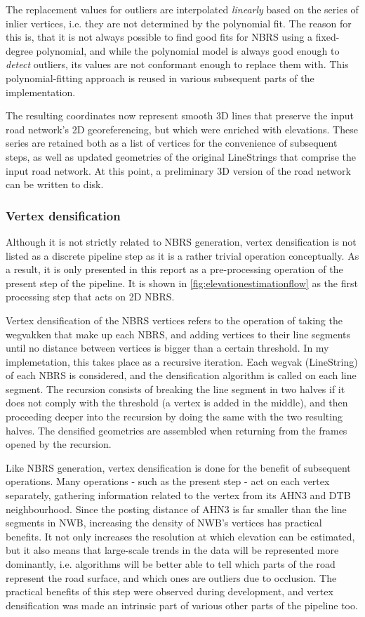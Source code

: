 The replacement values for outliers are interpolated \textit{linearly} based on the series of inlier vertices, i.e. they are not determined by the polynomial fit. The reason for this is, that it is not always possible to find good fits for NBRS using a fixed-degree polynomial, and while the polynomial model is always good enough to \textit{detect} outliers, its values are not conformant enough to replace them with. This polynomial-fitting approach is reused in various subsequent parts of the implementation.

The resulting coordinates now represent smooth 3D lines that preserve the input road network's 2D georeferencing, but which were enriched with elevations. These series are retained both as a list of vertices for the convenience of subsequent steps, as well as updated geometries of the original LineStrings that comprise the input road network. At this point, a preliminary 3D version of the road network can be written to disk.

\subsubsection{Vertex densification}

Although it is not strictly related to NBRS generation, vertex densification is not listed as a discrete pipeline step as it is a rather trivial operation conceptually. As a result, it is only presented in this report as a pre-processing operation of the present step of the pipeline. It is shown in \ref{fig:elevationestimationflow} as the first processing step that acts on 2D NBRS.

Vertex densification of the NBRS vertices refers to the operation of taking the wegvakken that make up each NBRS, and adding vertices to their line segments until no distance between vertices is bigger than a certain threshold. In my implemetation, this takes place as a recursive iteration. Each wegvak (LineString) of each NBRS is considered, and the densification algorithm is called on each line segment. The recursion consists of breaking the line segment in two halves if it does not comply with the threshold (a vertex is added in the middle), and then proceeding deeper into the recursion by doing the same with the two resulting halves. The densified geometries are assembled when returning from the frames opened by the recursion.

Like NBRS generation, vertex densification is done for the benefit of subsequent operations. Many operations - such as the present step - act on each vertex separately, gathering information related to the vertex from its AHN3 and DTB neighbourhood. Since the posting distance of AHN3 is far smaller than the line segments in NWB, increasing the density of NWB's vertices has practical benefits. It not only increases the resolution at which elevation can be estimated, but it also means that large-scale trends in the data will be represented more dominantly, i.e. algorithms will be better able to tell which parts of the road represent the road surface, and which ones are outliers due to occlusion. The practical benefits of this step were observed during development, and vertex densification was made an intrinsic part of various other parts of the pipeline too.

